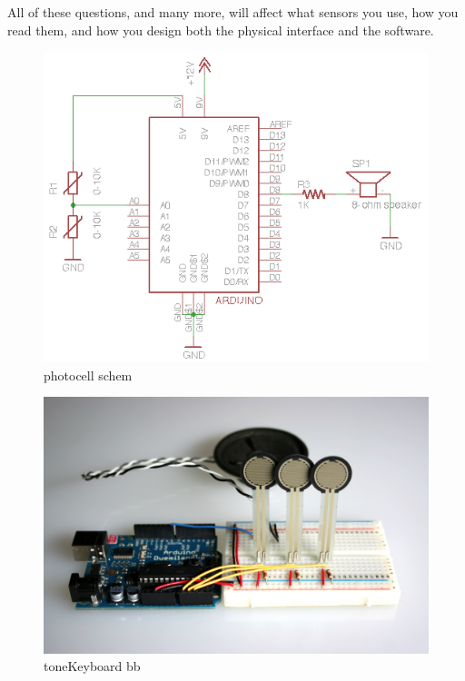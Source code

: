 All of these questions, and many more, will affect what sensors you use, how you read them, and how you design both the physical interface and the software.


\begin{figure}[!htb]
 \centering
 \includegraphics[scale=1]{img/toneout/photocell_schem.png}
 \caption{photocell schem}
 \label{photocell schem}
\end{figure}




\begin{figure}[!htb]
 \centering
 \includegraphics[scale=0.1]{img/toneout/toneKeyboard_bb.jpg}
 \caption{toneKeyboard bb}
 \label{toneKeyboard bb}
\end{figure}




